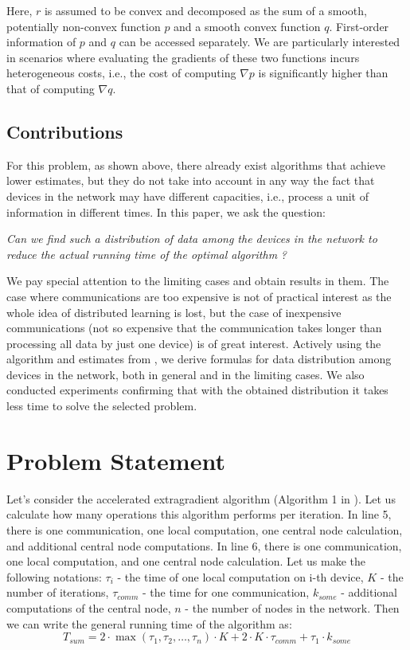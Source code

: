 \documentclass{article}
\begin{document}
Here, $r$ is assumed to be convex and decomposed as the sum of a smooth, potentially non-convex function $p$ and a smooth convex function $q$. First-order information of $p$ and $q$ can be accessed separately. We are particularly interested in scenarios where evaluating the gradients of these two functions incurs heterogeneous costs, i.e., the cost of computing $\nabla p$ is significantly higher than that of computing $\nabla q$.
\subsection{Contributions}

For this problem, as shown above, there already exist algorithms that achieve lower estimates, but they do not take into account in any way the fact that devices in the network may have different capacities, i.e., process a unit of information in different times. In this paper, we ask the question: 
\begin{center}
    \textit{ Can we find such a distribution of data among the devices in the network to reduce the actual running time of the optimal algorithm} \citep{kovalev2022optimal}\textit{?}
\end{center}
We pay special attention to the limiting cases and obtain results in them. The case where communications are too expensive is not of practical interest as the whole idea of distributed learning is lost, but the case of inexpensive communications (not so expensive that the communication takes longer than processing all data by just one device) is of great interest. Actively using the algorithm and estimates from \citep{kovalev2022optimal}, we derive formulas for data distribution among devices in the network, both in general and in the limiting cases. We also conducted experiments confirming that with the obtained distribution it takes less time to solve the selected problem.


\section{Problem Statement}

Let's consider the accelerated extragradient algorithm (Algorithm 1 in \cite{kovalev2022optimal}). Let us calculate how many operations this algorithm performs per iteration. In line 5, there is one communication, one local computation, one central node calculation, and additional central node computations. In line 6, there is one communication, one local computation, and one central node calculation. Let us make the following notations: $\tau_i$ - the time of one local computation on i-th device, $K$ - the number of iterations, $\tau_{comm}$ - the time for one communication, $k_{some}$ - additional computations of the central node, $n$ - the number of nodes in the network. Then we can write the general running time of the algorithm as:\\
\begin{equation}
    \label{eq:3}
    T_{sum} = 2\cdot\max(\tau_1, \tau_2, \ldots, \tau_n)\cdot K + 2\cdot K\cdot\tau_{comm} + \tau_1\cdot k_{some}
\end{equation}
\end{document}
